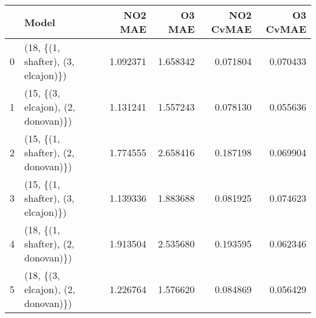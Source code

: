 \begin{tabular}{llrrrr}
\toprule
{} &                               Model &   NO2 MAE &    O3 MAE &  NO2 CvMAE &  O3 CvMAE \\
\midrule
0 &  (18, \{(1, shafter), (3, elcajon)\}) &  1.092371 &  1.658342 &   0.071804 &  0.070433 \\
1 &  (15, \{(3, elcajon), (2, donovan)\}) &  1.131241 &  1.557243 &   0.078130 &  0.055636 \\
2 &  (15, \{(1, shafter), (2, donovan)\}) &  1.774555 &  2.658416 &   0.187198 &  0.069904 \\
3 &  (15, \{(1, shafter), (3, elcajon)\}) &  1.139336 &  1.883688 &   0.081925 &  0.074623 \\
4 &  (18, \{(1, shafter), (2, donovan)\}) &  1.913504 &  2.535680 &   0.193595 &  0.062346 \\
5 &  (18, \{(3, elcajon), (2, donovan)\}) &  1.226764 &  1.576620 &   0.084869 &  0.056429 \\
\bottomrule
\end{tabular}

